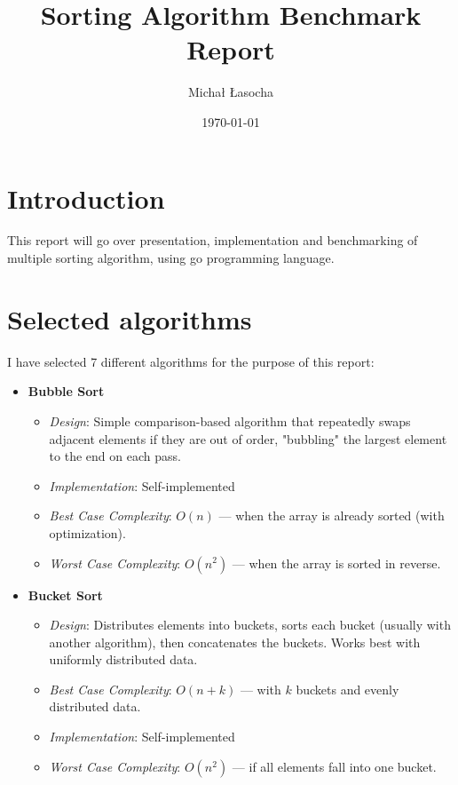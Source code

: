 \documentclass[11pt,a4paper]{article}
\title{Sorting Algorithm Benchmark Report}
\author{Michał Łasocha}
\date{\today}
\begin{document}
\maketitle
\tableofcontents
\newpage

\section{Introduction}
This report will go over presentation, implementation and benchmarking of
multiple sorting algorithm, using go programming language.
\section{Selected algorithms}
I have selected 7 different algorithms for the purpose of this report:
\begin{itemize}

	\item \textbf{Bubble Sort}
	      \begin{itemize}
		      \item \textit{Design}: Simple comparison-based algorithm that repeatedly swaps adjacent elements if they are out of order, "bubbling" the largest element to the end on each pass.
		      \item \textit{Implementation}: Self-implemented
		      \item \textit{Best Case Complexity}: \(O(n)\) — when the array is already sorted (with optimization).
		      \item \textit{Worst Case Complexity}: \(O(n^2)\) — when the array is sorted in reverse.
	      \end{itemize}

	\item \textbf{Bucket Sort}
	      \begin{itemize}
		      \item \textit{Design}: Distributes elements into buckets, sorts each bucket (usually with another algorithm), then concatenates the buckets. Works best with uniformly distributed data.
		      \item \textit{Best Case Complexity}: \(O(n + k)\) — with \(k\) buckets and evenly distributed data.
		      \item \textit{Implementation}: Self-implemented
		      \item \textit{Worst Case Complexity}: \(O(n^2)\) — if all elements fall into one bucket.
	      \end{itemize}


\end{itemize}
\end{document}
